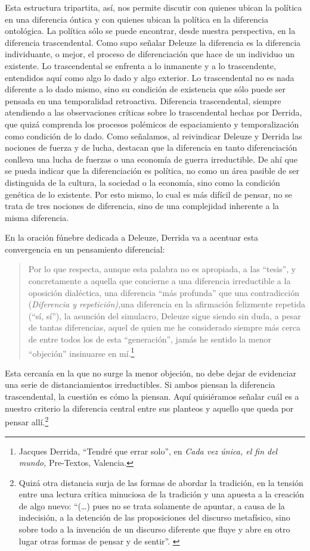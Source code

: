 Esta estructura tripartita, así, nos permite discutir con quienes ubican la política en una diferencia óntica y con quienes ubican la política en la diferencia ontológica. La política sólo se puede encontrar, desde nuestra perspectiva, en la diferencia trascendental. Como supo señalar Deleuze la diferencia es la diferencia individuante, o mejor, el proceso de diferenciación que hace de un individuo un existente. Lo trascendental se enfrenta a lo inmanente y a lo trascendente, entendidos aquí como algo lo dado y algo exterior. Lo trascendental no es nada diferente a lo dado mismo, sino su condición de existencia que sólo puede ser pensada en una temporalidad retroactiva. Diferencia trascendental, siempre atendiendo a las observaciones críticas sobre lo trascendental hechas por Derrida, que quizá comprenda los procesos polémicos de espaciamiento y temporalización como condición de lo dado. Como señalamos, al reivindicar Deleuze y Derrida las nociones de fuerza y de lucha, destacan que la diferencia en tanto diferenciación conlleva una lucha de fuerzas o una economía de guerra irreductible. De ahí que se pueda indicar que la diferenciación es política, no como un área pasible de ser distinguida de la cultura, la sociedad o la economía, sino como la condición genética  de lo existente. Por esto mismo, lo cual es más difícil de pensar, no se trata de tres nociones de diferencia, sino de una complejidad inherente a la misma diferencia.

En la oración fúnebre dedicada a Deleuze, Derrida va a acentuar esta convergencia en un pensamiento diferencial:

\begin{quote}
Por lo que respecta, aunque esta palabra no es apropiada, a las \enquote{tesis}, y concretamente a aquella que concierne a una diferencia irreductible a la oposición dialéctica, una diferencia \enquote{más profunda} que una contradicción (\emph{Diferencia y repetición),}una diferencia en la afirmación felizmente repetida (\enquote{sí, sí}), la asunción del simulacro, Deleuze sigue siendo sin duda, a pesar de tantas diferencias, aquel de quien me he considerado siempre más cerca de entre todos los de esta \enquote{generación}, jamás he sentido la menor \enquote{objeción} insinuarse en mí.\footnote{Jacques Derrida, \enquote{Tendré que errar solo}, en \emph{Cada vez única, el fin del mundo,} Pre-Textos, Valencia.}
\end{quote}

Esta cercanía en la que no surge la menor objeción, no debe dejar de evidenciar una serie de distanciamientos irreductibles. Si ambos piensan la diferencia trascendental, la cuestión es cómo la piensan. Aquí quisiéramos señalar cuál es a nuestro criterio la diferencia central entre sus planteos y aquello que queda por pensar allí.\footnote{Quizá otra distancia surja de las formas de abordar la tradición, en la tensión entre una lectura crítica minuciosa de la tradición y una apuesta a la creación de algo nuevo: \enquote{(\dots) pues no se trata solamente de apuntar, a causa de la indecisión, a la detención de las proposiciones del discurso metafísico, sino sobre todo a la invención de un discurso diferente que fluye y abre en otro lugar otras formas de pensar y de sentir}. \cite[114]{@6985-MENGUE2008}}

